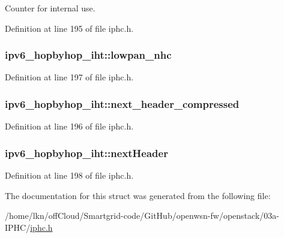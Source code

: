 Counter for internal use. 



Definition at line 195 of file iphc.\+h.

\subsubsection[{\texorpdfstring{lowpan\+\_\+nhc}{lowpan_nhc}}]{ ipv6\+\_\+hopbyhop\+\_\+iht\+::lowpan\+\_\+nhc}\hypertarget{structipv6__hopbyhop__iht_a80be6ddea14a217b2d4192868a1e61ae}{}\label{structipv6__hopbyhop__iht_a80be6ddea14a217b2d4192868a1e61ae}


Definition at line 197 of file iphc.\+h.

\subsubsection[{\texorpdfstring{next\+\_\+header\+\_\+compressed}{next_header_compressed}}]{ ipv6\+\_\+hopbyhop\+\_\+iht\+::next\+\_\+header\+\_\+compressed}\hypertarget{structipv6__hopbyhop__iht_a10cac8444dcacb21635e9b460d68874c}{}\label{structipv6__hopbyhop__iht_a10cac8444dcacb21635e9b460d68874c}


Definition at line 196 of file iphc.\+h.

\subsubsection[{\texorpdfstring{next\+Header}{nextHeader}}]{ ipv6\+\_\+hopbyhop\+\_\+iht\+::next\+Header}\hypertarget{structipv6__hopbyhop__iht_a22de87aa82608d6222ea1dfd254ca29c}{}\label{structipv6__hopbyhop__iht_a22de87aa82608d6222ea1dfd254ca29c}


Definition at line 198 of file iphc.\+h.



The documentation for this struct was generated from the following file\+:\begin{DoxyCompactItemize}
\item 
/home/lkn/off\+Cloud/\+Smartgrid-\/code/\+Git\+Hub/openwsn-\/fw/openstack/03a-\/\+I\+P\+H\+C/\hyperlink{iphc_8h}{iphc.\+h}\end{DoxyCompactItemize}
